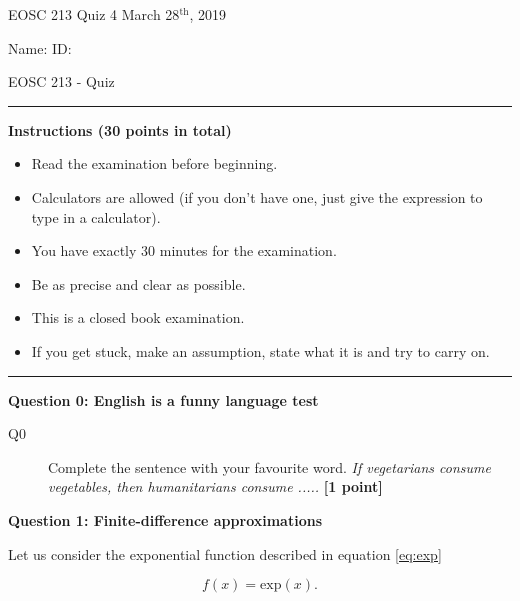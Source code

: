 \documentclass{article}
\begin{document}
\pagestyle{first}


\large{EOSC 213 Quiz 4} \hspace{10cm} \large{March 28$^{\textrm{th}}$, 2019}

\large{Name:} \hspace{12cm} \large{ID: }
\begin{center}
\Huge{EOSC 213 - Quiz}
\end{center}

\rule{\textwidth}{1pt}

\large{\textbf{Instructions (30 points in total)}}
\begin{multicols}{2}
\begin{itemize}
\item Read the examination before beginning.
\item Calculators are allowed (if you don't have one, just give the expression to type in a calculator).
\item You have exactly 30 minutes for the examination.
\item Be as precise and clear as possible.
\item This is a closed book examination.
\item If you get stuck, make an assumption, state what it is and try to carry on.
\end{itemize} 
\end{multicols}



\rule{\textwidth}{1pt}

\textbf{Question 0: English is a funny language test}

\begin{description}
\item [Q0] Complete the sentence with your favourite word. \textit{If vegetarians consume vegetables, then humanitarians consume .....}  \textbf{[1 point]}
\vspace{0.5cm}

\end{description}

\textbf{Question 1: Finite-difference approximations}

Let us consider the exponential function described in equation \ref{eq:exp}

\begin{equation}
f(x) = \mathrm{exp}(x). \label{eq:exp}
\end{equation} 
\end{document}

